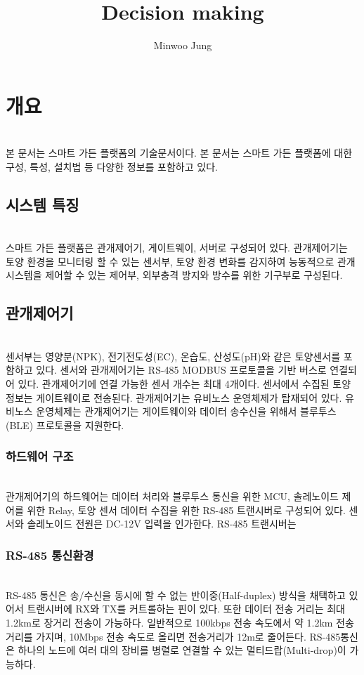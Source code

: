 \documentclass[11pt]{article}
\title{Decision making}
\author{Minwoo Jung}
\begin{document}
\maketitle

\section{개요}
\indent \\본 문서는 스마트 가든 플랫폼의 기술문서이다. 본 문서는 스마트 가든 플랫폼에 대한 구성, 특성, 설치법 등 다양한 정보를 포함하고 있다. 

\subsection{시스템 특징}
\indent \\스마트 가든 플랫폼은 관개제어기, 게이트웨이, 서버로 구성되어 있다. 관개제어기는 토양 환경을 모니터링 할 수 있는 센서부, 토양 환경 변화를 감지하여 능동적으로 관개시스템을 제어할 수 있는 제어부, 외부충격 방지와 방수를 위한 기구부로 구성된다. 

\subsection{관개제어기}
\indent \\센서부는 영양분(NPK), 전기전도성(EC), 온습도, 산성도(pH)와 같은 토양센서를 포함하고 있다. 센서와 관개제어기는 RS-485 MODBUS 프로토콜을 기반 버스로 연결되어 있다. 관개제어기에 연결 가능한 센서 개수는 최대 4개이다. 센서에서 수집된 토양 정보는 게이트웨이로 전송된다.
관개제어기는 유비노스 운영체제가 탑재되어 있다. 유비노스 운영체제는  
관개제어기는 게이트웨이와 데이터 송수신을 위해서 블루투스(BLE) 프로토콜을 지원한다.

\subsubsection{하드웨어 구조}
\indent \\관개제어기의 하드웨어는 데이터 처리와 블루투스 통신을 위한 MCU, 솔레노이드 제어를 위한 Relay, 토양 센서 데이터 수집을 위한 RS-485 트랜시버로 구성되어 있다. 센서와 솔레노이드 전원은 DC-12V 입력을 인가한다. RS-485 트랜시버는 

\subsubsection{RS-485 통신환경}
\indent \\RS-485 통신은 송/수신을 동시에 할 수 없는 반이중(Half-duplex) 방식을 채택하고 있어서 트랜시버에 RX와 TX를 커트롤하는 핀이 있다. 또한 데이터 전송 거리는 최대 1.2km로 장거리 전송이 가능하다. 일반적으로 100kbps 전송 속도에서 약 1.2km 전송거리를 가지며, 10Mbps 전송 속도로 올리면 전송거리가 12m로 줄어든다. RS-485통신은 하나의 노드에 여러 대의 장비를 병렬로 연결할 수 있는 멀티드랍(Multi-drop)이 가능하다.
\end{document}
